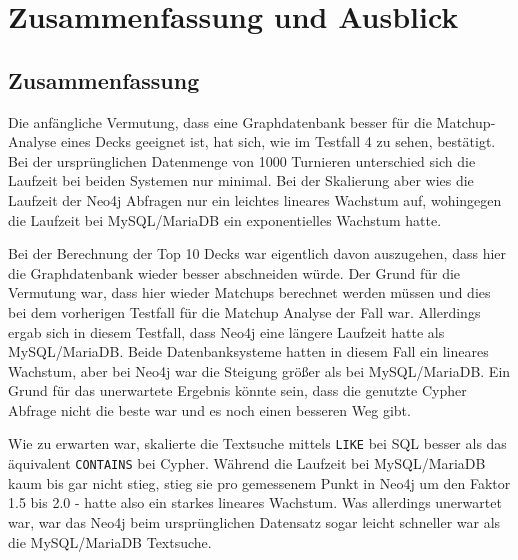 \chapter{Zusammenfassung und Ausblick}\label{ch:conclusion}

\section{Zusammenfassung}
% 

Die anfängliche Vermutung, dass eine Graphdatenbank besser für die Matchup-Analyse eines Decks geeignet ist, hat sich, wie im Testfall 4 zu sehen, bestätigt. Bei der ursprünglichen Datenmenge von 1000 Turnieren unterschied sich die Laufzeit bei beiden Systemen nur minimal. Bei der Skalierung aber wies die Laufzeit der Neo4j Abfragen nur ein leichtes lineares Wachstum auf, wohingegen die Laufzeit bei MySQL/MariaDB ein exponentielles Wachstum hatte.

Bei der Berechnung der Top 10 Decks war eigentlich davon auszugehen, dass hier die Graphdatenbank wieder besser abschneiden würde. Der Grund für die Vermutung war, dass hier wieder Matchups berechnet werden müssen und dies bei dem vorherigen Testfall für die Matchup Analyse der Fall war. Allerdings ergab sich in diesem Testfall, dass Neo4j eine längere Laufzeit hatte als MySQL/MariaDB. Beide Datenbanksysteme hatten in diesem Fall ein lineares Wachstum, aber bei Neo4j war die Steigung größer als bei MySQL/MariaDB. Ein Grund für das unerwartete Ergebnis könnte sein, dass die genutzte Cypher Abfrage nicht die beste war und es noch einen besseren Weg gibt.

Wie zu erwarten war, skalierte die Textsuche mittels \verb|LIKE| bei SQL besser als das äquivalent \verb|CONTAINS| bei Cypher. Während die Laufzeit bei MySQL/MariaDB kaum bis gar nicht stieg, stieg sie pro gemessenem Punkt in Neo4j um den Faktor 1.5 bis 2.0 - hatte also ein starkes lineares Wachstum. Was allerdings unerwartet war, war das Neo4j beim ursprünglichen Datensatz sogar leicht schneller war als die MySQL/MariaDB Textsuche.

